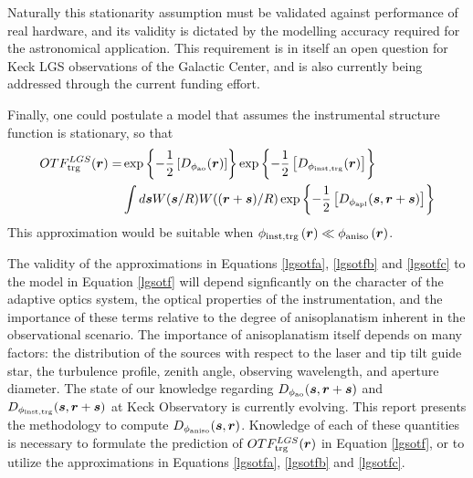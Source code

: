 Naturally this stationarity assumption must be validated against
performance of real hardware, and its validity is dictated by the
modelling accuracy required for the astronomical application.  This
requirement is in itself an open question for Keck LGS observations of
the Galactic Center, and is also currently being addressed through the
current funding effort.  

Finally, one could postulate a model that assumes the instrumental
structure function is stationary, so that
\begin{equation}\label{lgsotfc}
\begin{aligned}
OTF^{LGS}_{\rm trg}(\boldsymbol{r}) = 
& \exp{\left\{-{1 \over 2}\left[D_{\rm \phi_{\rm ao}}(\boldsymbol{r})\right]\right\}} 
\exp{\left\{-{1 \over 2}\left[D_{\rm \phi_{\rm inst,trg}}(\boldsymbol{r})\right]\right\}}  \\
& \int d\boldsymbol{s} W(\boldsymbol{s}/R)W((\boldsymbol{r}+\boldsymbol{s})/R) 
\exp{\left\{-{1 \over 2}\left[
D_{\rm \phi_{apl}}(\boldsymbol{s},\boldsymbol{r} + \boldsymbol{s})
\right]\right\}}
\end{aligned}
\end{equation}
This approximation would be suitable when $\phi_{\rm
  inst,trg}\left(\boldsymbol{r}\right)\ll\phi_{\rm
  aniso}\left(\boldsymbol{r}\right)$.

The validity of the approximations in Equations \ref{lgsotfa},
\ref{lgsotfb} and \ref{lgsotfc} to the model in Equation \ref{lgsotf}
will depend signficantly on the character of the adaptive optics
system, the optical properties of the instrumentation, and the
importance of these terms relative to the degree of anisoplanatism
inherent in the observational scenario.  The importance of
anisoplanatism itself depends on many factors: the distribution of the
sources with respect to the laser and tip tilt guide star, the
turbulence profile, zenith angle, observing wavelength, and aperture
diameter.  The state of our knowledge regarding $D_{\rm
  \phi_{ao}}(\boldsymbol{s},\boldsymbol{r} + \boldsymbol{s})$ and
$D_{\rm \phi_{inst,trg}}(\boldsymbol{s},\boldsymbol{r} +
\boldsymbol{s})$ at Keck Observatory is currently evolving.  This
report presents the methodology to compute $D_{\rm
  \phi_{aniso}}(\boldsymbol{s},\boldsymbol{r})$.  Knowledge of each of
these quantities is necessary to formulate the prediction of
$OTF^{LGS}_{\rm trg}(\boldsymbol{r})$ in Equation \ref{lgsotf}, or to
utilize the approximations in Equations \ref{lgsotfa}, \ref{lgsotfb}
and \ref{lgsotfc}.

